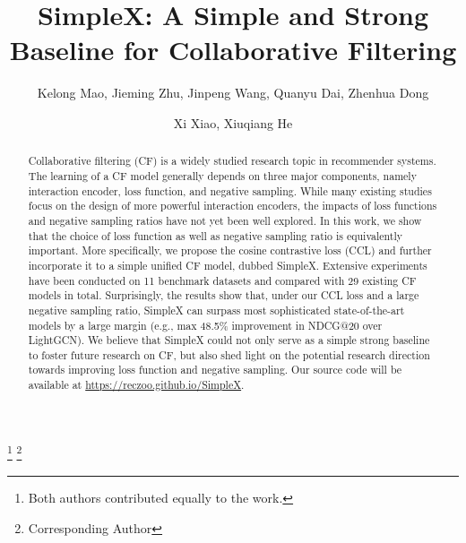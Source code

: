 \documentclass[sigconf,authorversion]{acmart}
\begin{document}
\fancyhead{}
\title{SimpleX: A Simple and Strong Baseline for Collaborative Filtering}

\author{Kelong Mao, Jieming Zhu,  Jinpeng Wang,  Quanyu Dai,  Zhenhua Dong}
\author{Xi Xiao,  Xiuqiang He}
\thanks{ Both authors contributed equally to the work.}
\thanks{ Corresponding Author}



\renewcommand{\authors}{Kelong Mao, Jieming Zhu, Jinpeng Wang, Quanyu Dai, Zhenhua Dong, Xi Xiao, Xiuqiang He}
















\begin{abstract}
Collaborative filtering (CF) is a widely studied research topic in recommender systems. The learning of a CF model generally depends on three major components, namely interaction encoder, loss function, and negative sampling. While many existing studies focus on the design of more powerful interaction encoders, the impacts of loss functions and negative sampling ratios have not yet been well explored. In this work, we show that the choice of loss function as well as negative sampling ratio is equivalently important. More specifically, we propose the {cosine contrastive loss} (CCL) and further incorporate it to a simple unified CF model, dubbed SimpleX. Extensive experiments have been conducted on 11 benchmark datasets and compared with 29 existing CF models in total. Surprisingly, the results show that, under our CCL loss and a large negative sampling ratio, SimpleX can surpass most sophisticated state-of-the-art models by a large margin (e.g., max 48.5\% improvement in NDCG@20 over LightGCN). We believe that SimpleX could not only serve as a simple strong baseline to foster future research on CF, but also shed light on the potential research direction towards improving loss function and negative sampling. Our source code will be available at \textcolor{magenta}{\url{https://reczoo.github.io/SimpleX}}.
\end{abstract}
\end{document}
